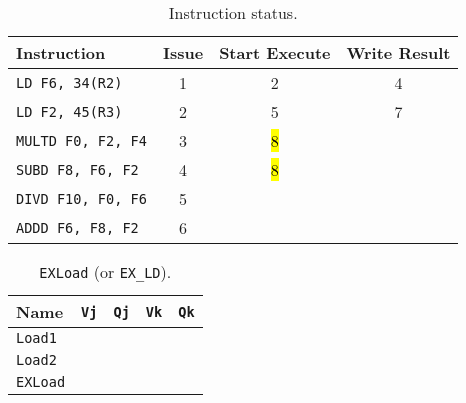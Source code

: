 \begin{enumerate}
    \begin{table}[!htp]
        \centering
        \begin{tabular}{@{} l | c c c @{}}
            \toprule
            Instruction                 & Issue & Start Execute & Write Result  \\
            \midrule
            \texttt{LD    F6, 34(R2)}   & 1     & 2             & 4             \\ [.3em]
            \texttt{LD    F2, 45(R3)}   & 2     & 5             & 7             \\ [.3em]
            \texttt{MULTD F0, F2, F4}   & 3     & \hl{8}        &               \\ [.3em]
            \texttt{SUBD  F8, F6, F2}   & 4     & \hl{8}        &               \\ [.3em]
            \texttt{DIVD  F10, F0, F6}  & 5     &               &               \\ [.3em]
            \texttt{ADDD  F6, F8, F2}   & 6     &               &               \\
            \bottomrule
        \end{tabular}
        \caption*{Instruction status.}
    \end{table}

    \begin{table}[!htp]
        \centering
        \begin{tabular}{@{} l | c c c c @{}}
            \toprule
            Name            & \texttt{Vj}   & \texttt{Qj}   & \texttt{Vk}           & \texttt{Qk}   \\
            \midrule
            \texttt{Load1}  &               &               &                       &               \\ [.3em]
            \texttt{Load2}  &               &               &                       &               \\
            \cmidrule{1-5}
            \texttt{EXLoad} &               &               &                       &               \\
            \bottomrule
        \end{tabular}
        \caption*{\texttt{EXLoad} (or \texttt{EX\_LD}).}
    \end{table}


\end{enumerate}

